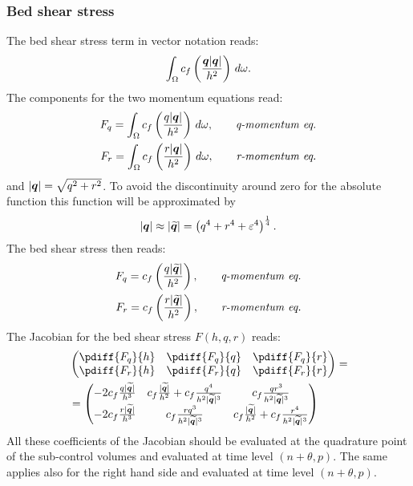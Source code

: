 \subsubsection{Bed shear stress}
The bed shear stress  term in vector notation reads:
\begin{align}
    \int_\Omega c_f \left( \frac{\bm{q}\lvert \bm{q} \rvert}{h^2} \right)\, d\omega.
\end{align}
The components for the two momentum equations read:
\begin{align}
    F_q = \int_\Omega c_f \left( \frac{q\lvert \bm{q} \rvert}{h^2} \right)\, d\omega, \qquad \textit{q-momentum eq.}
    \\
    F_r = \int_\Omega c_f \left( \frac{r\lvert \bm{q} \rvert}{h^2} \right)\, d\omega, \qquad \textit{r-momentum eq.}
\end{align}
and $\lvert \bm{q} \rvert = \sqrt{q^2 + r^2}$.
To avoid the discontinuity around zero for the absolute function this function will be approximated by
\begin{align}
    \lvert \bm{q} \rvert \approx \lvert \widetilde{\bm{q}} \rvert = \left( q^4 + r^4 + \varepsilon^4 \right)^{\frac{1}{4}}.
\end{align}
The bed shear stress then reads:
\begin{align}
    F_q = c_f \left( \frac{q\lvert \widetilde{\bm{q}} \rvert}{h^2} \right), \qquad \textit{q-momentum eq.}
    \\
    F_r = c_f \left( \frac{r\lvert \widetilde{\bm{q}} \rvert}{h^2} \right), \qquad \textit{r-momentum eq.}
\end{align}
The Jacobian for the bed shear stress $F(h,q,r)$ reads:
\begin{align}
    &\begin{pmatrix}
        \pdiff{F_q}{h} & \pdiff{F_q}{q} & \pdiff{F_q}{r}
        \\
        \pdiff{F_r}{h} & \pdiff{F_r}{q} & \pdiff{F_r}{r}
    \end{pmatrix}
    =
    \\
    &=
    \begin{pmatrix}
       -2c_f \frac{q\abs{\widetilde{\vec{q}}}}{h^3}
       & c_f\frac{\abs{\widetilde{\vec{q}}}}{h^2} + c_f \frac{q^4}{h^2\abs{\widetilde{\vec{q}}}^3}
       & c_f \frac{qr^3}{h^2\abs{\widetilde{\vec{q}}}^3}
       \\
       -2c_f \frac{r\abs{\widetilde{\vec{q}}}}{h^3}
       & c_f \frac{rq^3}{h^2\abs{\widetilde{\vec{q}}}^3}
       & c_f\frac{\abs{\widetilde{\vec{q}}}}{h^2} + c_f \frac{r^4}{h^2\abs{\widetilde{\vec{q}}}^3}
    \end{pmatrix}
\end{align}
All these coefficients of the Jacobian should be evaluated at the quadrature point of the sub-control volumes and evaluated at time level $(n+\theta,p)$.
The same applies also for the right hand side and evaluated at time level $(n+\theta,p)$.


